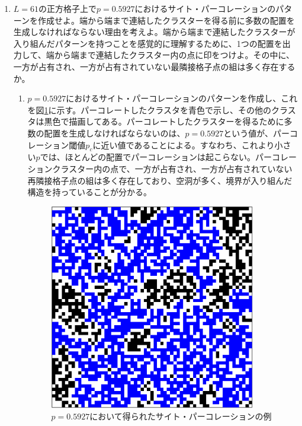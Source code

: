 \documentclass{jsarticle}
\begin{document}
        \begin{enumerate}
            \renewcommand{\labelenumi}{\alph{enumi}.}
            \renewcommand{\labelenumii}{}
            
            \item $L=61$の正方格子上で$p=0.5927$におけるサイト・パーコレーションのパターンを作成せよ。端から端まで連結したクラスターを得る前に多数の配置を生成しなければならない理由を考えよ。端から端まで連結したクラスターが入り組んだパターンを持つことを感覚的に理解するために、1つの配置を出力して、端から端まで連結したクラスター内の点に印をつけよ。その中に、一方が占有され、一方が占有されていない最隣接格子点の組は多く存在するか。
                
                \begin{enumerate}
                    \item $p=0.5927$におけるサイト・パーコレーションのパターンを作成し、これを図\ref{fig:14-1-f1}に示す。パーコレートしたクラスタを青色で示し、その他のクラスタは黒色で描画してある。パーコレートしたクラスターを得るために多数の配置を生成しなければならないのは、$p =0.5927$という値が、パーコレーション閾値$p_{c}$に近い値であることによる\cite{cite2}。すなわち、これより小さい$p$では、ほとんどの配置でパーコレーションは起こらない。パーコレーションクラスター内の点で、一方が占有され、一方が占有されていない再隣接格子点の組は多く存在しており、空洞が多く、境界が入り組んだ構造を持っていることが分かる。
                    
                    \begin{figure}[H]
                        \begin{center}
                            \includegraphics[width=9.0cm]{figure_1(p=0_5927).pdf}
                            \caption{$p=0.5927$において得られたサイト・パーコレーションの例}
                            \label{fig:14-1-f1}
                        \end{center}


\end{figure}
\end{enumerate}
\end{enumerate}
\end{document}
